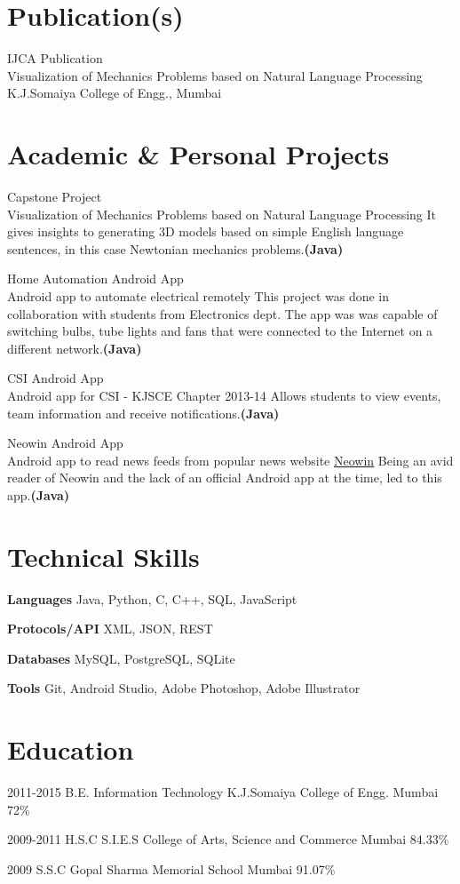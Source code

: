 \documentclass[10pt, a4paper, sans]{moderncv}
\begin{document}
\section{Publication(s)}
\cventry
{IJCA Publication \\
\href{http://www.ijcaonline.org/archives/volume116/number14/20408-2766}{\faFile}}
{Visualization of Mechanics Problems based on
Natural Language Processing}
{K.J.Somaiya College of Engg., Mumbai}
{}
{}
{}

\section{Academic \& Personal Projects}
\cventry
{Capstone Project \\ {\faGithub}}
{Visualization of Mechanics Problems based on
Natural Language Processing}
{}
{}
{}
{It gives insights to generating 3D models based on simple English language sentences, in this case Newtonian mechanics problems.\bfseries{(Java)}}

\cventry
{Home Automation Android App \\ {\faAndroid}}
{Android app to automate electrical remotely}
{}
{}
{}
{This project was done in collaboration with students from Electronics dept. The app was was capable of switching bulbs,  tube lights and fans that were connected to the Internet on a different network.\bfseries{(Java)}}

\cventry
{CSI Android App \\ {\faAndroid}}
{Android app for CSI - KJSCE Chapter 2013-14}
{}
{}
{}
{Allows students to view events, team information and receive notifications.\bfseries{(Java)}}

\cventry
{Neowin Android App \\ {\faAndroid}}
{Android app to read news feeds from popular news website \href{http://www.neowin.net/}{Neowin}}
{}
{}
{}
{Being an avid reader of Neowin and the lack of an official Android app at the time, led to this app.\bfseries{(Java)}}

\section{Technical Skills}
\cvitem
{\bfseries{Languages}}
{Java, Python, C, C++, SQL, JavaScript}

\cvitem
{\bfseries{Protocols/API}}
{XML, JSON, REST}

\cvitem
{\bfseries{Databases}}
{MySQL, PostgreSQL, SQLite}

\cvitem
{\bfseries{Tools}}
{Git, Android Studio, Adobe Photoshop, Adobe Illustrator}

\section{Education}
\cventry
{2011-2015}
{B.E. Information Technology}
{K.J.Somaiya College of Engg.}
{Mumbai}
{72\%}
{}

\cventry
{2009-2011}
{H.S.C}
{S.I.E.S College of Arts, Science and Commerce}
{Mumbai}
{84.33\%}
{}

\cventry
{2009}
{S.S.C}
{Gopal Sharma Memorial School}
{Mumbai}
{91.07\%}
{}
\end{document}
